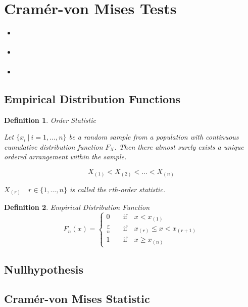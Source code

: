 \documentclass[11pt,twoside,a4paper]{article}
\theoremstyle{assumpstyle} \newtheorem{assumption}{Assumption}
\theoremstyle{assumpstyle} \newtheorem{definition}{Definition}
\begin{document}
	\section{Cram\'{e}r-von Mises Tests}
		\begin{itemize}
			\item \cite{darling_kolmogorov-smirnov_1957}
			\item \cite{anderson_asymptotic_1952}
			\item \cite{buning_nichtparametrische_2013}
		\end{itemize}
	
		\subsection{Empirical Distribution Functions}
			
			\cite{gibbons_nonparametric_2021}
			\begin{definition} Order Statistic
				
				Let $\{x_i \: \vert \: i = 1, \dots , n\}$ be a random sample from a population with continuous cumulative distribution function $F_X$. Then there almost surely exists a unique ordered arrangement within the sample. 
				
				$$X_{(1)} < X_{(2)} < \dots < X_{(n)}$$
				
				$X_{(r)} \quad r \in \{1, \dots, n\}$ is called the $r$th-order statistic.	
			\end{definition}
		
			\begin{definition}	Empirical Distribution Function
				\begin{equation}
					F_{n}(x) = \begin{cases}
						0 & \quad \text{if} \quad  x < x_{(1)} \\
						\frac{r}{n} & \quad \text{if} \quad  x_{(r)} \leq x < x_{(r + 1)} \\
						1 & \quad \text{if} \quad  x \geq x_{(n)}
					\end{cases}
				\end{equation}
			\end{definition}
		
		\subsection{Nullhypothesis}
		
		\subsection{Cram\'{e}r-von Mises Statistic}
			
\end{document}
